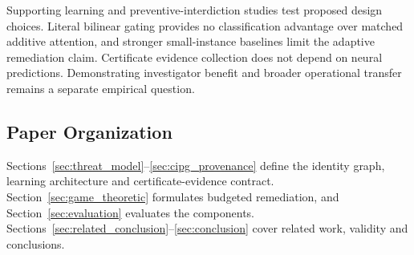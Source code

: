 Supporting learning and preventive-interdiction studies test proposed design choices. Literal bilinear gating provides no classification advantage over matched additive attention, and stronger small-instance baselines limit the adaptive remediation claim. Certificate evidence collection does not depend on neural predictions. Demonstrating investigator benefit and broader operational transfer remains a separate empirical question.

\subsection{Paper Organization}
Sections~\ref{sec:threat_model}--\ref{sec:cipg_provenance} define the identity graph, learning architecture and certificate-evidence contract. Section~\ref{sec:game_theoretic} formulates budgeted remediation, and Section~\ref{sec:evaluation} evaluates the components. Sections~\ref{sec:related_conclusion}--\ref{sec:conclusion} cover related work, validity and conclusions.
